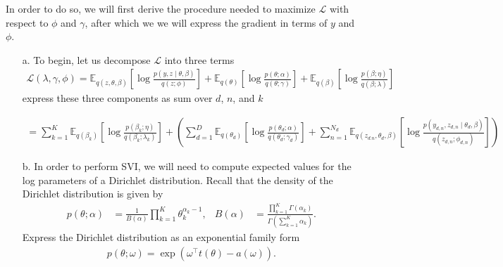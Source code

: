 \documentclass [12pt]{article}
\newcommand{\E}{\ensuremath{\mathbb{E}}}
\begin{document}
In order to do so, we will first derive the procedure needed to maximize $\mathcal{L}$ with respect to $\phi$ and $\gamma$, after which we we will express the gradient in terms of $y$ and $\phi$.   
\begin{itemize}
\item[a.] To begin, let us decompose $\mathcal{L}$ into three terms
\begin{align*}
	\mathcal{L}(\lambda, \gamma, \phi)
    = 
    \E_{q(z,\theta,\beta)}
    \left[
    	\log 
        \frac{p(y,z \mid  \theta, \beta)}
             {q(z ; \phi)}
    \right]
    +
    \E_{q(\theta)}
    \left[
    	\log 
        \frac{p(\theta ; \alpha)}
             {q(\theta ; \gamma)}
    \right]
    +
    \E_{q(\beta)}
    \left[
    	\log 
        \frac{p(\beta ; \eta)}
             {q(\beta ; \lambda)}
    \right]
\end{align*}
express these three components as sum over $d$, $n$, and $k$ 




\begin{align*}
     = 
    \sum_{k=1}^{K} \E_{q(\beta_k)}
    \left[
    	\log 
        \frac{p(\beta_k ; \eta)}
             {q(\beta_k ; \lambda_k)}
    \right]
    + 
   \left(  \sum_{d=1}^{D} 
    \E_{q(\theta_d)}
    \left[
    	\log 
        \frac{p(\theta_d ; \alpha)}
             {q(\theta_d ; \gamma_d)}
    \right]
    +
    \sum_{n=1}^{N_d}
    \E_{q(z_{d.n},\theta_d,\beta)}
    \left[
    	\log 
        \frac{p(y_{d,n},z_{d,n} \mid  \theta_d, \beta)}
             {q(z_{d,n} ; \phi_{d,n})}
    \right] \right) 
\end{align*}










\item[b.] In order to perform SVI, we will need to compute expected values for the log parameters of a Dirichlet distribution. Recall that the density of the Dirichlet distribution is given by
\begin{align*}
	p(\theta ; \alpha) 
    &= 
    \frac{1}{B(\alpha)} \prod_{k=1}^K \theta_k^{\alpha_k - 1},
    &
    B(\alpha)
    &= 
    \frac{\prod_{k=1}^K \Gamma(\alpha_k)}{\Gamma \left( \sum_{k=1}^K \alpha_k \right)}
    .
\end{align*}
Express the Dirichlet distribution as an exponential family form
\begin{align*}
	p(\theta ; \omega) = \exp \left( \omega^\top t(\theta) - a(\omega) \right).
\end{align*}



\end{itemize}
\end{document}
